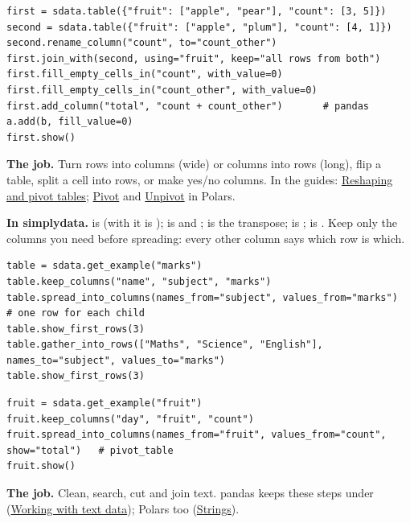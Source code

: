 \begin{lstlisting}[style=py]
first = sdata.table({"fruit": ["apple", "pear"], "count": [3, 5]})
second = sdata.table({"fruit": ["apple", "plum"], "count": [4, 1]})
second.rename_column("count", to="count_other")
first.join_with(second, using="fruit", keep="all rows from both")
first.fill_empty_cells_in("count", with_value=0)
first.fill_empty_cells_in("count_other", with_value=0)
first.add_column("total", "count + count_other")       # pandas a.add(b, fill_value=0)
first.show()
\end{lstlisting}


\textbf{The job.} Turn rows into columns (wide) or columns into rows (long), flip a table, split a cell
into rows, or make yes/no columns. In the guides:
\href{https://pandas.pydata.org/docs/user_guide/reshaping.html}{Reshaping and pivot tables};
\href{https://docs.pola.rs/user-guide/transformations/pivot/}{Pivot} and
\href{https://docs.pola.rs/user-guide/transformations/unpivot/}{Unpivot} in Polars.

\textbf{In simplydata.}  is  (with  it is
);  is  and ;
 is the transpose;  is ;
 is . Keep only the columns you need before
spreading: every other column says which row is which.

\begin{lstlisting}[style=py]
table = sdata.get_example("marks")
table.keep_columns("name", "subject", "marks")
table.spread_into_columns(names_from="subject", values_from="marks")   # one row for each child
table.show_first_rows(3)
table.gather_into_rows(["Maths", "Science", "English"], names_to="subject", values_to="marks")
table.show_first_rows(3)
\end{lstlisting}

\begin{lstlisting}[style=py]
fruit = sdata.get_example("fruit")
fruit.keep_columns("day", "fruit", "count")
fruit.spread_into_columns(names_from="fruit", values_from="count", show="total")   # pivot_table
fruit.show()
\end{lstlisting}


\textbf{The job.} Clean, search, cut and join text. pandas keeps these steps under 
(\href{https://pandas.pydata.org/docs/user_guide/text.html}{Working with text data}); Polars too
(\href{https://docs.pola.rs/user-guide/expressions/strings/}{Strings}).

